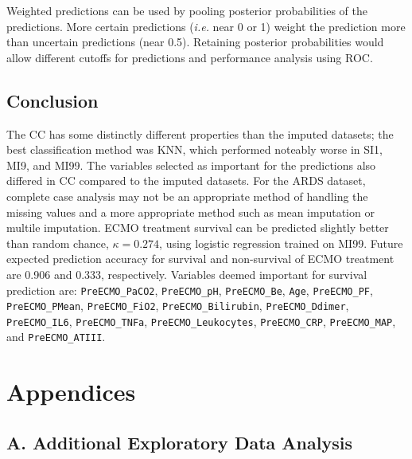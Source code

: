 \documentclass[12pt,]{article}
\newcommand{\appendixA}{ \setcounter{table}{0} \renewcommand{\thetable}{A\arabic{table}} \setcounter{figure}{0} \renewcommand{\thefigure}{A\arabic{figure}} }
\begin{document}
Weighted predictions can be used by pooling posterior probabilities of
the predictions. More certain predictions (\emph{i.e.} near 0 or 1)
weight the prediction more than uncertain predictions (near 0.5).
Retaining posterior probabilities would allow different cutoffs for
predictions and performance analysis using ROC.

\subsection{Conclusion}\label{conclusion}

The CC has some distinctly different properties than the imputed
datasets; the best classification method was KNN, which performed
noteably worse in SI1, MI9, and MI99. The variables selected as
important for the predictions also differed in CC compared to the
imputed datasets. For the ARDS dataset, complete case analysis may not
be an appropriate method of handling the missing values and a more
appropriate method such as mean imputation or multile imputation. ECMO
treatment survival can be predicted slightly better than random chance,
\(\kappa=0.274\), using logistic regression trained on MI99. Future
expected prediction accuracy for survival and non-survival of ECMO
treatment are 0.906 and 0.333, respectively. Variables deemed important
for survival prediction are: \texttt{PreECMO\_PaCO2},
\texttt{PreECMO\_pH}, \texttt{PreECMO\_Be}, \texttt{Age},
\texttt{PreECMO\_PF}, \texttt{PreECMO\_PMean}, \texttt{PreECMO\_FiO2},
\texttt{PreECMO\_Bilirubin}, \texttt{PreECMO\_Ddimer},
\texttt{PreECMO\_IL6}, \texttt{PreECMO\_TNFa},
\texttt{PreECMO\_Leukocytes}, \texttt{PreECMO\_CRP},
\texttt{PreECMO\_MAP}, and \texttt{PreECMO\_ATIII}.

\newpage

\section*{Appendices}\label{appendices}

\subsection*{A. Additional Exploratory Data
Analysis}\label{a.-additional-exploratory-data-analysis}

\appendixA
\end{document}
